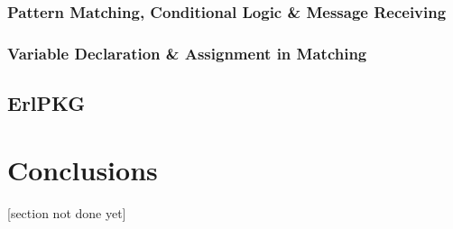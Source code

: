 \documentclass[twoside,12pt,titlepage,a4paper]{article}
\begin{document}


\subsubsection{Pattern Matching, Conditional Logic \& Message Receiving}
\subsubsection{Variable Declaration \& Assignment in Matching}
\subsection{ErlPKG}

\section{Conclusions}
\label{Conclusions}

[section not done yet]
\end{document}
